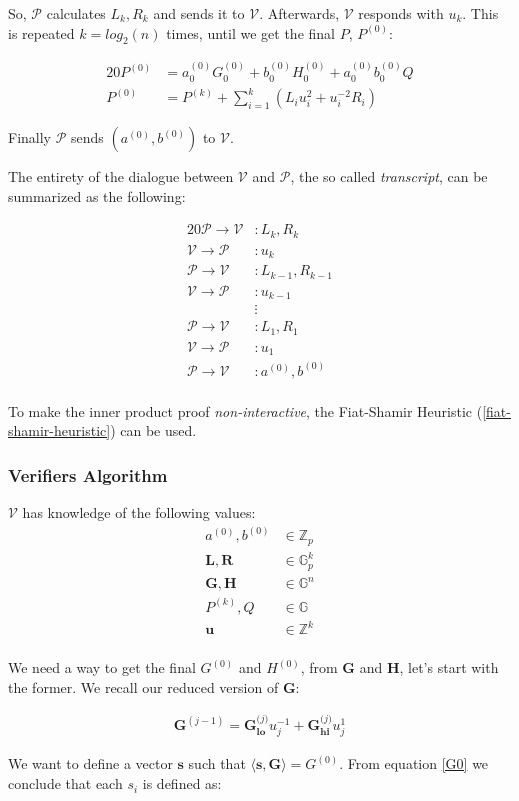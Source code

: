 \documentclass{article}
\newcommand{\eq}[1]{\begin{alignat*}{20}#1\end{alignat*}}
\newcommand{\eqn}[2]{\begin{equation}\label{#1}\begin{split}#2\end{split}\end{equation}}
\renewcommand{\vec}[1]{\boldsymbol{#1}}
\newcommand{\V}{\mathcal{V}}
\renewcommand{\P}{\mathcal{P}}
\newcommand{\G}{\mathbb{G}}
\newcommand{\Z}{\mathbb{Z}}
\newcommand{\dotp}[2]{\langle #1, #2 \rangle}
\newcommand{\opn}[1]{\operatorname{#1}}
\newcommand{\veclo}[1]{\vec{#1_{\opn{lo}}}}
\newcommand{\vechi}[1]{\vec{#1_{\opn{hi}}}}
\begin{document}
So, $\P$ calculates $L_k, R_k$ and sends it to $\V$. Afterwards,
$\V$ responds with $u_k$. This is repeated $k = log_2(n)$ times,
until we get the final $P$, $P^{(0)}$:

\eq{
	P^{(0)} &= a^{(0)}_0 G^{(0)}_0 + b^{(0)}_0 H^{(0)}_0 + a^{(0)}_0 b^{(0)}_0 Q \\
	P^{(0)} &= P^{(k)} + \sum^k_{i=1}(L_i u^2_i + u^{-2}_i R_i)
}

Finally $\P$ sends $(a^{(0)}, b^{(0)})$ to $\V$.

The entirety of the dialogue between $\V$ and $\P$,
the so called \textit{transcript}, can be summarized as the following:

\eq{
	\P \rightarrow \V &: L_k, R_k \\
	\V \rightarrow \P &: u_k \\[5pt]
	\P \rightarrow \V &: L_{k-1}, R_{k-1} \\
	\V \rightarrow \P &: u_{k-1} \\[-5pt]
	                  &\vdots \\
	\P \rightarrow \V &: L_{1}, R_{1} \\
	\V \rightarrow \P &: u_{1} \\[5pt]
	\P \rightarrow \V &: a^{(0)}, b^{(0)} \\
}

To make the inner product proof \textit{non-interactive}, the
Fiat-Shamir Heuristic (\ref{fiat-shamir-heuristic}) can be used.

\subsubsection{Verifiers Algorithm}
$\V$ has knowledge of the following values:
\eqn{def1-ver}{
	a^{(0)}, b^{(0)} &\in \Z_p \\
	\vec{L}, \vec{R} &\in \G_p^{k} \\
	\vec{G}, \vec{H} &\in \G^n \\
	P^{(k)}, Q &\in \G \\
	\vec{u} &\in \Z^{k} \\
}

We need a way to get the final $G^{(0)}$ and $H^{(0)}$, from $\vec{G}$
and $\vec{H}$, let's start with the former. We recall our reduced
version of $\vec{G}$:

\eqn{G0}{
	\vec{G}^{(j-1)} = \veclo{G^\textit{(j)}} u^{-1}_j + \vechi{G^\textit{(j)}} u^{1}_j
}

We want to define a vector $\vec{s}$ such that $\dotp{\vec{s}}{\vec{G}}
= G^{(0)}$. From equation \ref{G0} we conclude that each $s_i$ is
defined as:
\end{document}
